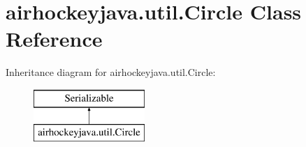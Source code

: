 \hypertarget{classairhockeyjava_1_1util_1_1_circle}{}\section{airhockeyjava.\+util.\+Circle Class Reference}
\label{classairhockeyjava_1_1util_1_1_circle}
Inheritance diagram for airhockeyjava.\+util.\+Circle\+:\begin{figure}[H]
\begin{center}
\leavevmode
\includegraphics[height=2.000000cm]{classairhockeyjava_1_1util_1_1_circle}
\end{center}
\end{figure}
